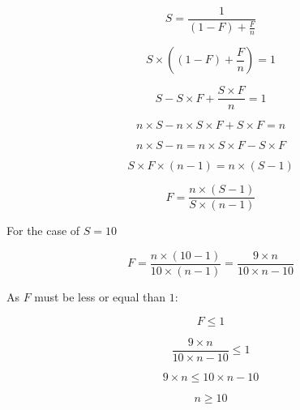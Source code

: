 

\begin{comparchsol}
\end{comparchsol}

\[
S = \frac{1}{\left(1 - F \right) + \displaystyle \frac{F}{n} }
\]

\[
S \times \left( (1-F) + \frac{F}{n} \right) = 1
\]

\[
S - S \times F + \frac{S \times F}{n} = 1
\]

\[
n \times S - n \times S \times F + S \times F = n
\]

\[
n \times S - n = n \times S \times F - S \times F
\]

\[
S \times F \times \left( n - 1 \right) = n \times \left( S - 1 \right)
\]

\[
F = \frac{n \times (S-1)}{S \times(n-1)}
\]

For the case of $S = 10$

\[
F = \frac{n \times (10-1)}{10 \times (n-1)} = 
\frac{9 \times n}{10 \times n - 10}
\]

As $F$ must be less or equal than $1$:

\[
F \leq 1
\]

\[
\frac{9 \times n}{10 \times n -10} \leq 1
\]

\[
9 \times n \leq 10 \times n-10
\]

\[
n \geq 10
\]


